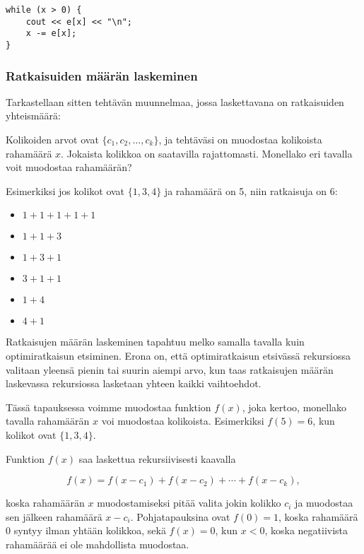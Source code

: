 \begin{lstlisting}
while (x > 0) {
    cout << e[x] << "\n";
    x -= e[x];
}
\end{lstlisting}

\subsubsection{Ratkaisuiden määrän laskeminen}

Tarkastellaan sitten tehtävän muunnelmaa,
jossa laskettavana on ratkaisuiden yhteismäärä:
\begin{task}
Kolikoiden arvot ovat $\{c_1,c_2,\ldots,c_k\}$,
ja tehtäväsi on muodostaa kolikoista rahamäärä $x$.
Jokaista kolikkoa on saatavilla rajattomasti.
Monellako eri tavalla voit muodostaa rahamäärän?
\end{task}

\noindent
Esimerkiksi jos kolikot ovat $\{1,3,4\}$ ja rahamäärä on 5,
niin ratkaisuja on 6:

\begin{itemize}[noitemsep]
\item $1+1+1+1+1$
\item $1+1+3$
\item $1+3+1$
\item $3+1+1$
\item $1+4$
\item $4+1$
\end{itemize}

Ratkaisujen määrän laskeminen tapahtuu melko samalla tavalla
kuin optimiratkaisun etsiminen.
Erona on, että optimiratkaisun etsivässä rekursiossa
valitaan yleensä pienin tai suurin aiempi arvo,
kun taas ratkaisujen määrän laskevassa rekursiossa lasketaan
yhteen kaikki vaihtoehdot.

Tässä tapauksessa voimme muodostaa funktion $f(x)$,
joka kertoo, monellako tavalla rahamäärän $x$
voi muodostaa kolikoista.
Esimerkiksi $f(5)=6$, kun kolikot ovat $\{1,3,4\}$.

Funktion $f(x)$ saa laskettua rekursiivisesti kaavalla

\[ f(x) = f(x-c_1)+f(x-c_2)+\cdots+f(x-c_k),\]

\noindent
koska rahamäärän $x$ muodostamiseksi pitää
valita jokin kolikko $c_i$ ja muodostaa sen jälkeen rahamäärä $x-c_i$.
Pohjatapauksina ovat $f(0)=1$, koska rahamäärä 0 syntyy
ilman yhtään kolikkoa,
sekä $f(x)=0$, kun $x<0$, koska negatiivista rahamäärää
ei ole mahdollista muodostaa.

